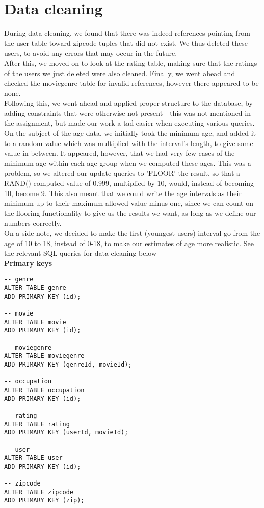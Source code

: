\section*{Data cleaning}

\noindent During data cleaning, we found that there was indeed references pointing from the user table toward zipcode tuples that did not exist. We thus deleted these users, to avoid any errors that may occur in the future. \\
After this, we moved on to look at the rating table, making sure that the ratings of the users we just deleted were also cleaned. Finally, we went ahead and checked the moviegenre table for invalid references, however there appeared to be none. \\
\indent Following this, we went ahead and applied proper structure to the database, by adding constraints that were otherwise not present - this was not mentioned in the assignment, but made our work a tad easier when executing various queries. \\
On the subject of the age data, we initially took the minimum age, and added it to a random value which was multiplied with the interval's length, to give some value in between. It appeared, however, that we had very few cases of the minimum age within each age group when we computed these ages. This was a problem, so we altered our update queries to 'FLOOR' the result, so that a RAND() computed value of 0.999, multiplied by 10, would, instead of becoming 10, become 9. This also meant that we could write the age intervals as their minimum up to their maximum allowed value minus one, since we can count on the flooring functionality to give us the results we want, as long as we define our numbers correctly. \\
\indent On a side-note, we decided to make the first (youngest users) interval go from the age of 10 to 18, instead of 0-18, to make our estimates of age more realistic.
See the relevant SQL queries for data cleaning below \\

\noindent\textbf{Primary keys} \\

\begin{lstlisting}
-- genre
ALTER TABLE genre
ADD PRIMARY KEY (id);

-- movie
ALTER TABLE movie
ADD PRIMARY KEY (id);

-- moviegenre
ALTER TABLE moviegenre
ADD PRIMARY KEY (genreId, movieId);

-- occupation
ALTER TABLE occupation
ADD PRIMARY KEY (id);

-- rating
ALTER TABLE rating
ADD PRIMARY KEY (userId, movieId);

-- user
ALTER TABLE user
ADD PRIMARY KEY (id);

-- zipcode
ALTER TABLE zipcode
ADD PRIMARY KEY (zip);
\end{lstlisting}
\bigskip

